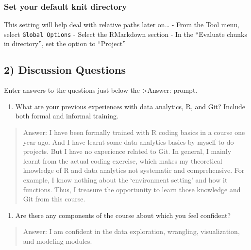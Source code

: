 \documentclass[
]{article}
\providecommand{\tightlist}{%
  \setlength{\itemsep}{0pt}\setlength{\parskip}{0pt}}
\begin{document}
\hypertarget{set-your-default-knit-directory}{%
\subsubsection{Set your default knit
directory}\label{set-your-default-knit-directory}}

This setting will help deal with relative paths later on\ldots{} - From
the Tool menu, select \texttt{Global\ Options} - Select the RMarkdown
section - In the ``Evaluate chunks in directory'', set the option to
``Project''

\hypertarget{discussion-questions}{%
\subsection{2) Discussion Questions}\label{discussion-questions}}

Enter answers to the questions just below the \textgreater Answer:
prompt.

\begin{enumerate}
\def\labelenumi{\arabic{enumi}.}
\tightlist
\item
  What are your previous experiences with data analytics, R, and Git?
  Include both formal and informal training.
\end{enumerate}

\begin{quote}
Answer: I have been formally trained with R coding basics in a course
one year ago. And I have learnt some data analytics basics by myself to
do projects. But I have no experience related to Git. In general, I
mainly learnt from the actual coding exercise, which makes my
theoretical knowledge of R and data analytics not systematic and
comprehensive. For example, I know nothing about the `environment
setting' and how it functions. Thus, I treasure the opportunity to learn
those knowledge and Git from this course.
\end{quote}

\begin{enumerate}
\def\labelenumi{\arabic{enumi}.}
\setcounter{enumi}{1}
\tightlist
\item
  Are there any components of the course about which you feel confident?
\end{enumerate}

\begin{quote}
Answer: I am confident in the data exploration, wrangling,
visualization, and modeling modules.
\end{quote}
\end{document}
